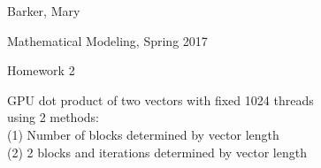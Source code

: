 \documentclass{article}
\def \hwnum{2}
\def \hwdescription{GPU dot product of two vectors with fixed 1024 threads \\ using 2 methods: \\ (1) Number of blocks determined by vector length \\ (2) 2 blocks and iterations determined by vector length}
\def \hwscript{hw02.cu}
\begin{document}
{\color{white}{thing}}
\begin{center}
{
	\fontsize{20pt}{20pt}\selectfont
	Barker, Mary
}

\vspace{1cm}

{
	\fontsize{20pt}{20pt}\selectfont
	Mathematical Modeling, Spring 2017
}

\vspace{1cm}

{
	\fontsize{20pt}{20pt}\selectfont
	Homework \hwnum
}

\vspace{1cm}

{
	\fontsize{20pt}{20pt}\selectfont
	\hwdescription
}

\end{center}
\pagebreak

\end{document}
